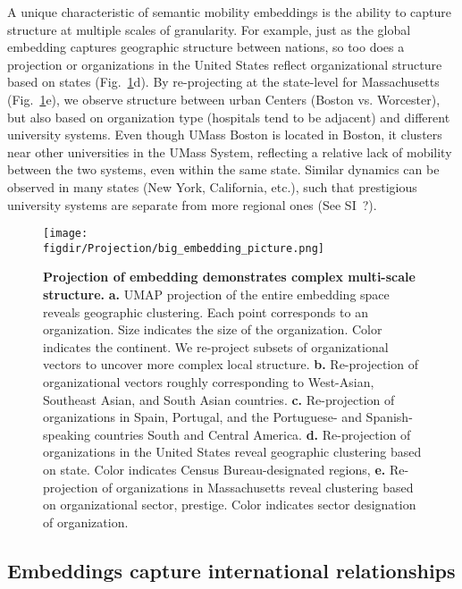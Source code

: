 \documentclass[12pt]{article} %
\def\figdir{../Figs}
\begin{document}
A unique characteristic of semantic mobility embeddings is the ability to capture structure at multiple scales of granularity.
For example, just as the global embedding captures geographic structure between nations, so too does a projection or organizations in the United States reflect organizational structure based on states (Fig.~\ref{fig:projection}d). 
By re-projecting at the state-level for Massachusetts (Fig.~\ref{fig:projection}e), we observe structure between urban Centers (Boston vs. Worcester), but also based on organization type (hospitals tend to be adjacent) and different university systems. Even though UMass Boston is located in Boston, it clusters near other universities in the UMass System, reflecting a relative lack of mobility between the two systems, even within the same state. 
Similar dynamics can be observed in many states (New York, California, etc.), such that prestigious university systems are separate from more regional ones (See SI~?).

\begin{figure}[hp!]
	\centering
	\texttt{[image: \\figdir/Projection/big\_embedding\_picture.png]}
	\caption{
		\textbf{Projection of embedding demonstrates complex multi-scale structure.}
		\textbf{a.}
		UMAP projection \autocite{mcinnes2018umap} of the entire embedding space reveals geographic clustering.
		Each point corresponds to an organization. 
		Size indicates the size of the organization.
		Color indicates the continent. 
		We re-project subsets of organizational vectors to uncover more complex local structure.
		\textbf{b.} Re-projection of organizational vectors roughly corresponding to West-Asian, Southeast Asian, and South Asian countries. 
		\textbf{c.} Re-projection of organizations in Spain, Portugal, and the Portuguese- and Spanish-speaking countries South and Central America. 
		\textbf{d.} Re-projection of organizations in the United States reveal geographic clustering based on state.
		Color indicates Census Bureau-designated regions,
		\textbf{e.} Re-projection of organizations in Massachusetts reveal clustering based on organizational sector, prestige. 
		Color indicates sector designation of organization. 
	}
	\label{fig:projection}
\end{figure}


\subsection*{Embeddings capture international relationships}
\end{document}
